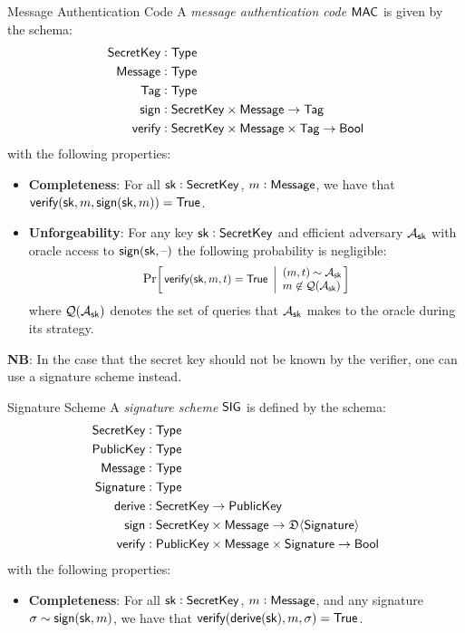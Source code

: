 \begin{definitiontoc}{Message Authentication Code}
    A \emph{message authentication code} ${\textsf{MAC}}$ is given by the schema:
    \begin{align*}
        {\textsf{SecretKey}} &: {\textsf{Type}} \\
        {\textsf{Message}}   &: {\textsf{Type}} \\
        {\textsf{Tag}}       &: {\textsf{Type}} \\
        {\textsf{sign}}      &: {\textsf{SecretKey}} \times {\textsf{Message}} \to {\textsf{Tag}} \\
        {\textsf{verify}}    &: {\textsf{SecretKey}} \times {\textsf{Message}} \times {\textsf{Tag}} \to {\textsf{Bool}}
    \end{align*}
    with the following properties:
    \begin{itemize}
        \item \textbf{Completeness}: For all ${\textsf{sk}} : {\textsf{SecretKey}}$, $m : {\textsf{Message}}$, we have that ${\textsf{verify}}({\textsf{sk}}, m, {\textsf{sign}}({\textsf{sk}}, m)) = {\textsf{True}}$.
        \item \textbf{Unforgeability}: For any key ${\textsf{sk}} : {\textsf{SecretKey}}$ and efficient adversary $\mathcal{A}_{\textsf{sk}}$ with oracle access to ${\textsf{sign}}({\textsf{sk}}, {\textrm{--}})$ the following probability is negligible:
            \[
                \Prob{
                    \verify(\sk, m, t) = \True
                }{
                    (m, t) \sim \mathcal{A}_\sk \\
                    m \not\in \mathcal{Q}(\mathcal{A}_\sk)
                }
            \]
            where $\mathcal{Q}(\mathcal{A}_{\textsf{sk}})$ denotes the set of queries that $\mathcal{A}_{\textsf{sk}}$ makes to the oracle during its strategy.
    \end{itemize}

    \textbf{NB}: In the case that the secret key should not be known by the verifier, one can use a signature scheme instead.
\end{definitiontoc}

\begin{definitiontoc}{Signature Scheme}
    A \emph{signature scheme} ${\textsf{SIG}}$ is defined by the schema:
    \begin{align*}
        {\textsf{SecretKey}}    &: {\textsf{Type}} \\
        {\textsf{PublicKey}}    &: {\textsf{Type}} \\
        {\textsf{Message}}      &: {\textsf{Type}} \\
        {\textsf{Signature}}    &: {\textsf{Type}} \\
        {\textsf{derive}}       &: {\textsf{SecretKey}} \to {\textsf{PublicKey}} \\
        {\textsf{sign}}         &: {\textsf{SecretKey}} \times {\textsf{Message}} \to \mathfrak{D}\langle{{\textsf{Signature}}}\rangle \\
        {\textsf{verify}}       &: {\textsf{PublicKey}} \times {\textsf{Message}} \times {\textsf{Signature}} \to {\textsf{Bool}}
    \end{align*}
    with the following properties:
    \begin{itemize}
        \item \textbf{Completeness}: For all ${\textsf{sk}} : {\textsf{SecretKey}}$, $m : {\textsf{Message}}$, and any signature $\sigma \sim {\textsf{sign}}({\textsf{sk}}, m)$, we have that ${\textsf{verify}}({\textsf{derive}}({\textsf{sk}}), m, \sigma) = {\textsf{True}}$.
    \end{itemize}
\end{definitiontoc}

